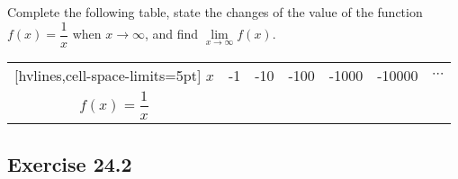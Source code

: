 \documentclass[12pt]{report}
\begin{document}
Complete the following table, state the changes of the value of the function $f
    (x) = \dfrac{1}{x}$ when $x \to \infty$, and find $\lim\limits_{x \to \infty} f
    (x)$.

\begin{center}
    \begin{NiceTabular}{|c|c|c|c|c|c|c|}[hvlines,cell-space-limits=5pt]
        $x$                   & -1 & -10 & -100 & -1000 & -10000 & $\cdots$ \\
        $f (x) = \dfrac{1}{x}$ &    &     &      &       &        &          \\
    \end{NiceTabular}
\end{center}

\subsection{Exercise 24.2}
\end{document}

